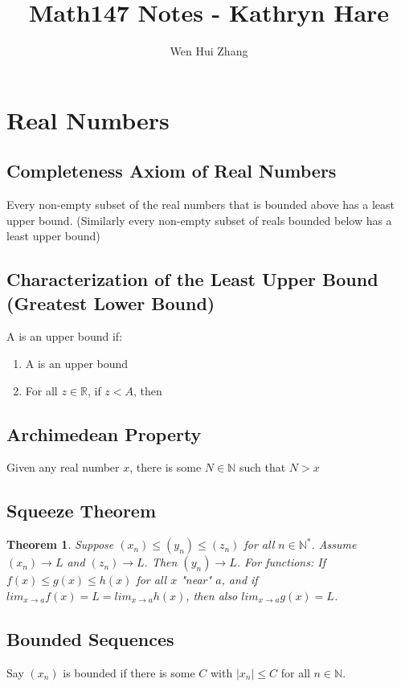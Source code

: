 \documentclass[11pt]{article}
\title{Math147 Notes - Kathryn Hare}
\author{Wen Hui Zhang}
\newcommand{\N}{{\mathbb N}}
\newcommand{\R}{{\mathbb R}}
\newtheorem {thm}{Theorem}
\begin{document}
	\maketitle
	\newpage

\section{Real Numbers}

\subsection{Completeness Axiom of Real Numbers}
Every non-empty subset of the real numbers that is bounded above has a least upper bound.
(Similarly every non-empty subset of reals bounded below has a least upper bound)

\subsection{Characterization of the Least Upper Bound (Greatest Lower Bound)}
A is an upper bound if:
\begin{enumerate}
	\item A is an upper bound
	\item For all $z \in \R$, if $z < A$, then
\end{enumerate}

\subsection{Archimedean Property}
Given any real number $x$, there is some $N  \in \N$ such that $N > x$

\subsection{Squeeze Theorem}
\begin{thm}
Suppose $(x_n) \leq (y_n) \leq (z_n)$ for all $n \in \N^*$. Assume $(x_n) \longrightarrow  L$ and
$(z_n) \longrightarrow  L$. Then $(y_n) \longrightarrow  L$.
\newline
\newline
For functions: If $f(x) \leq g(x) \leq h(x)$ for all $x$  "near" $a$, and if $lim_{x \to a} f(x) = L = lim_{x \to a} h(x)$,
then also $lim_{x \to a} g(x) = L$.
\end{thm}

\subsection{Bounded Sequences}
Say $(x_n)$ is bounded if there is some $C$ with $|x_n| \leq C$ for all $n \in \N$.
\end{document}

